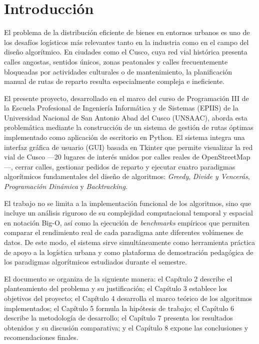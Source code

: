 \chapter{Introducción}

El problema de la distribución eficiente de bienes en entornos urbanos es uno de los desafíos logísticos más relevantes tanto en la industria como en el campo del diseño algorítmico. En ciudades como el Cusco, cuya red vial histórica presenta calles angostas, sentidos únicos, zonas peatonales y calles frecuentemente bloqueadas por actividades culturales o de mantenimiento, la planificación manual de rutas de reparto resulta especialmente compleja e ineficiente.

El presente proyecto, desarrollado en el marco del curso de Programación III de la Escuela Profesional de Ingeniería Informática y de Sistemas (EPIIS) de la Universidad Nacional de San Antonio Abad del Cusco (UNSAAC), aborda esta problemática mediante la construcción de un sistema de gestión de rutas óptimas implementado como aplicación de escritorio en Python. El sistema integra una interfaz gráfica de usuario (GUI) basada en Tkinter que permite visualizar la red vial de Cusco ---20 lugares de interés unidos por calles reales de OpenStreetMap---, cerrar calles, gestionar pedidos de reparto y ejecutar cuatro paradigmas algorítmicos fundamentales del diseño de algoritmos: \textit{Greedy}, \textit{Divide y Vencerás}, \textit{Programación Dinámica} y \textit{Backtracking}.

El trabajo no se limita a la implementación funcional de los algoritmos, sino que incluye un análisis riguroso de su complejidad computacional temporal y espacial en notación Big-O, así como la ejecución de \textit{benchmarks} empíricos que permiten comparar el rendimiento real de cada paradigma ante diferentes volúmenes de datos. De este modo, el sistema sirve simultáneamente como herramienta práctica de apoyo a la logística urbana y como plataforma de demostración pedagógica de los paradigmas algorítmicos estudiados durante el semestre.

El documento se organiza de la siguiente manera: el Capítulo 2 describe el planteamiento del problema y su justificación; el Capítulo 3 establece los objetivos del proyecto; el Capítulo 4 desarrolla el marco teórico de los algoritmos implementados; el Capítulo 5 formula la hipótesis de trabajo; el Capítulo 6 describe la metodología de desarrollo; el Capítulo 7 presenta los resultados obtenidos y su discusión comparativa; y el Capítulo 8 expone las conclusiones y recomendaciones finales.
